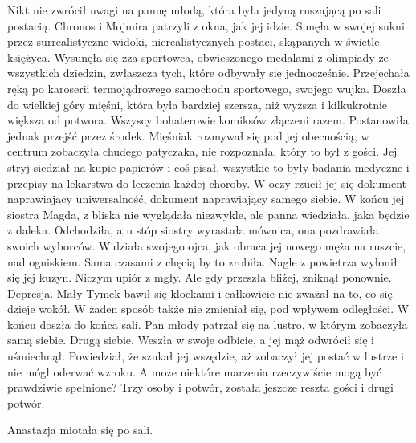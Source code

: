 Nikt nie zwrócił uwagi na pannę młodą, która była jedyną ruszającą po sali postacią. Chronos i Mojmira patrzyli z okna, jak jej idzie.
Sunęła w swojej sukni przez surrealistyczne widoki, nierealistycznych postaci, skąpanych w świetle księżyca.
Wysunęła się zza sportowca, obwieszonego medalami z olimpiady ze wszystkich dziedzin, zwłaszcza tych, które odbywały się jednocześnie.
Przejechała ręką po karoserii termojądrowego samochodu sportowego, swojego wujka.
Doszła do wielkiej góry mięśni, która była bardziej szersza, niż wyższa i kilkukrotnie większa od potwora. Wszyscy bohaterowie komiksów złączeni razem.
Postanowiła jednak przejść przez środek. Mięśniak rozmywał się pod jej obecnością, w centrum zobaczyła chudego patyczaka, nie rozpoznała, który to był z gości.
Jej stryj siedział na kupie papierów i coś pisał, wszystkie to były badania medyczne i przepisy na lekarstwa do leczenia każdej choroby.
W oczy rzucił jej się dokument naprawiający uniwersalność, dokument naprawiający samego siebie.
W końcu jej siostra Magda, z bliska nie wyglądała niezwykle, ale panna wiedziała, jaka będzie z daleka. 
Odchodziła, a u stóp siostry wyrastała mównica, ona pozdrawiała swoich wyborców.
Widziała swojego ojca, jak obraca jej nowego męża na ruszcie, nad ogniskiem. Sama czasami z chęcią by to zrobiła.
Nagle z powietrza wyłonił się jej kuzyn. Niczym upiór z mgły.
Ale gdy przeszła bliżej, zniknął ponownie. Depresja.
Mały Tymek bawił się klockami i całkowicie nie zważał na to, co się dzieje wokół. W żaden sposób także nie zmieniał się, pod wpływem odległości.
W końcu doszła do końca sali. Pan młody patrzał się na lustro, w którym zobaczyła samą siebie. Drugą siebie.
Weszła w swoje odbicie, a jej mąż odwrócił się i uśmiechnął. Powiedział, że szukał jej wszędzie, aż zobaczył jej postać w lustrze i nie mógł oderwać wzroku.
A może niektóre marzenia rzeczywiście mogą być prawdziwie spełnione?
Trzy osoby i potwór, została jeszcze reszta gości i drugi potwór.

Anastazja miotała się po sali.

